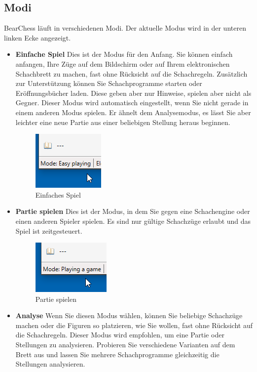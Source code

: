 \documentclass[11pt,a4paper]{article}
\begin{document}
	\subsection{Modi}
	BearChess läuft in verschiedenen Modi. Der aktuelle Modus wird in der unteren linken Ecke angezeigt.
	\begin{itemize}
		
		\item \textbf{Einfache Spiel} Dies ist der Modus für den Anfang. Sie können einfach anfangen, Ihre Züge auf dem Bildschirm oder auf Ihrem elektronischen Schachbrett zu machen, fast ohne Rücksicht auf die Schachregeln. Zusätzlich zur Unterstützung können Sie Schachprogramme starten oder Eröffnungsbücher laden. Diese geben aber nur Hinweise, spielen aber nicht als Gegner. Dieser Modus wird automatisch eingestellt, wenn Sie nicht gerade in einem anderen Modus spielen. Er ähnelt dem Analysemodus, es lässt Sie aber leichter eine neue Partie aus einer beliebigen Stellung heraus beginnen.
		\begin{figure}[H]
			\centering
			\includegraphics[scale=1.0]{ModeEasyPlaying.png}
			\caption{Einfaches Spiel}
			\label{fig:ModeEasyPlaying}
		\end{figure}
		\item \textbf{Partie spielen} Dies ist der Modus, in dem Sie gegen eine Schachengine oder einen anderen Spieler spielen. Es sind nur gültige Schachzüge erlaubt und das Spiel ist zeitgesteuert.
		\begin{figure}[H]
			\centering
			\includegraphics[scale=1.0]{ModePlayingAGame.png}
			\caption{Partie spielen}
			\label{fig:ModePlayingAGame}
		\end{figure}
		\item \textbf{Analyse} Wenn Sie diesen Modus wählen, können Sie beliebige Schachzüge machen oder die Figuren so platzieren, wie Sie wollen, fast ohne Rücksicht auf die Schachregeln. Dieser Modus wird empfohlen, um eine Partie oder Stellungen zu analysieren. Probieren Sie verschiedene Varianten auf dem Brett aus und lassen Sie mehrere Schachprogramme gleichzeitig die Stellungen analysieren.

\end{itemize}
\end{document}
